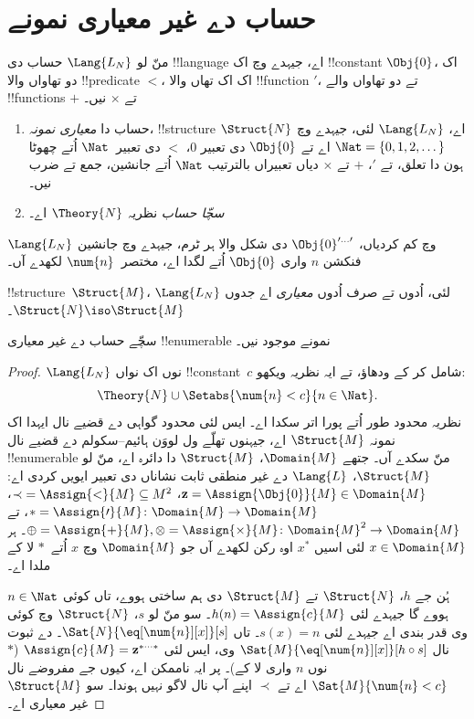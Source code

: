 \documentclass[../../../include/open-logic-section]{subfiles}
\begin{document}
\section{حساب دے غیر معیاری نمونے}

\begin{defn}
منّ لو $\Lang{L_N}$ حساب دی !!{language} اے، جیہدے وچ اک !!{constant} $\Obj{0}$، اک دو تھاواں والا !!{predicate} $<$، اک اک تھاں والا !!{function} $\prime$، تے دو تھاواں والے !!{function}s $+$ تے $\times$ نیں۔
\begin{enumerate}
\item حساب دا \emph{معیاری نمونہ}، !!{structure} $\Struct{N}$ اے، $\Lang{L_N}$ لئی، جیہدے وچ $\Nat = \{ 0, 1, 2, \dots\}$ اے تے $\Obj{0}$ دی تعبیر $0$، $<$ دی تعبیر~$\Nat$ اُتے چھوٹا ہون دا تعلق، تے $\prime$، $+$ تے $\times$ دیاں تعبیراں بالترتیب $\Nat$ اُتے جانشین، جمع تے ضرب نیں۔
\item \emph{سچّا حساب} نظریہ $\Theory{N}$ اے۔
\end{enumerate}
\end{defn}

$\Lang{L_N}$ وچ کم کردیاں، $\Obj{0}^{\prime\dots\prime}$ دی شکل والا ہر ٹرم، جیہدے وچ جانشین فنکشن $n$ واری $\Obj{0}$ اُتے لگدا اے، مختصر~$\num{n}$ لکھدے آں۔

\begin{defn}
!!{structure}~$\Struct{M}$، $\Lang{L_N}$ لئی، اُدوں تے صرف اُدوں \emph{معیاری} اے جدوں $\Struct{N} \iso \Struct{M}$۔
\end{defn}

\begin{thm}
سچّے حساب دے غیر معیاری !!{enumerable} نمونے موجود نیں۔
\end{thm}

\begin{proof}
$\Lang{L_N}$ نوں اک نواں !!{constant}~$c$ شامل کر کے ودھاؤ، تے ایہ نظریہ ویکھو:
\[
\Theory{N} \cup \Setabs{\num{n} < c}{n \in \Nat}.
\]
نظریہ محدود طور اُتے پورا اتر سکدا اے۔ ایس لئی محدود گواہی دے قضیے نال ایہدا اک نمونہ $\Struct{M}$ اے، جیہنوں تھلّے ول لووَن ہائیم--سکولم دے قضیے نال !!{enumerable} منّ سکدے آں۔ جتھے $\Domain{M}$، $\Struct{M}$ دا دائرہ اے، منّ لو $\Struct{M}$، $\Lang{L}$ دے غیر منطقی ثابت نشاناں دی تعبیر ایویں کردی اے:
$\mathbf{z} = \Assign{\Obj{0}}{M} \in \Domain{M}$، ${\prec} =
\Assign{<}{M} \subseteq M^2$، $* = \Assign{\prime}{M} \colon
\Domain{M} \to \Domain{M}$، تے $\oplus = \Assign{+}{M}, \otimes =
\Assign{\times}{M} \colon \Domain{M}^2 \to \Domain{M}$۔ ہر $x
\in \Domain{M}$ لئی اسیں $x^*$ اوہ رکن لکھدے آں جو $\Domain{M}$ وچ $x$ اُتے~$*$ لا کے ملدا اے۔

ہُن جے $h$، $\Struct{N}$ تے $\Struct{M}$ دی ہم ساختی ہووے، تاں کوئی $n \in \Nat$ ہووے گا جیہدے لئی $h(n) = \Assign{c}{M}$۔ سو منّ لو $s$، $\Struct{N}$ وچ کوئی وی قدر بندی اے جیہدے لئی $s(x) = n$۔ تاں $\Sat{N}{\eq[\num{n}][x]}[s]$۔  دے ثبوت نال $\Sat{M}{\eq[\num{n}][x]}[h \circ s]$ وی، ایس لئی $\Assign{c}{M} =
\mathbf{z}^{*\cdots *}$ ($*$ نوں $n$ واری لا کے)۔ پر ایہ ناممکن اے، کیوں جے مفروضے نال $\Sat{M}{\num{n} < c}$ اے تے $\prec$ اپنے آپ نال لاگو نہیں ہوندا۔ سو $\Struct{M}$ غیر معیاری اے۔
\end{proof}
\end{document}
